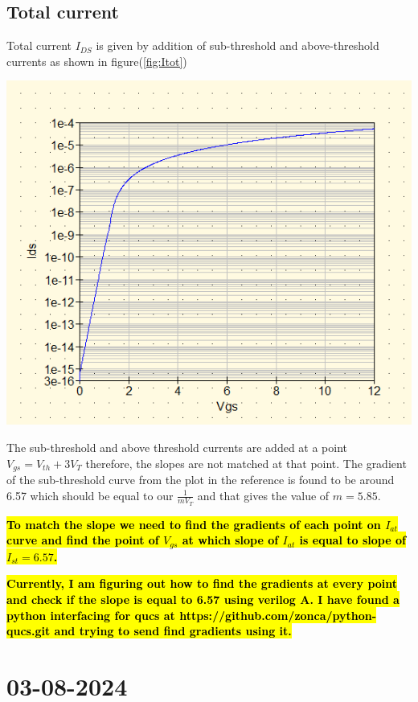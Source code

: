 \documentclass{article}
\begin{document}
\subsection{Total current}
Total current $I_{DS}$ is given by addition of sub-threshold and above-threshold currents as shown in figure(\ref{fig:Itot})
\begin{center}
    \label{fig:Itot}
    \includegraphics[scale=0.7]{../Images/22072024/Ids-total.png}
\end{center}

The sub-threshold and above threshold currents are added at a point  $V_{gs} = V_{th}+3V_T$ therefore, the slopes are not matched at that point. The gradient of the sub-threshold curve from the plot in the reference is found to be around 6.57 which should be equal to our $\frac{1}{m V_T}$ and that gives the value of $m = 5.85$. 

\hl{\textbf{To match the slope we need to find the gradients of each point on $I_{at}$ curve and find the point of $V_{gs}$ at which slope of $I_{at}$ is equal to slope of $I_{st} = 6.57$.  }}

\hl{\textbf{Currently, I am figuring out how to find the gradients at every point and check if the slope is equal to 6.57 using verilog A. I have found a python interfacing for qucs at https://github.com/zonca/python-qucs.git and trying to send find gradients using it. }}

\section{03-08-2024}
\end{document}
